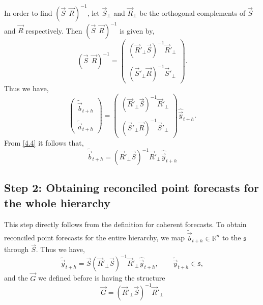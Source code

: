 \documentclass[graybox]{svmult}
\begin{document}
In order to find $(\vec{S} ~ ~ \vec{R})^{-1}$, let $\vec{S}_{\bot}$ and $\vec{R}_{\bot}$ be the orthogonal complements of $\vec{S}$ and $\vec{R}$
respectively. Then $(\vec{S} ~ ~ \vec{R})^{-1}$ is given by,
\begin{equation}\label{eq:16}
(\vec{S} ~ ~ \vec{R})^{-1} = \begin{pmatrix}
(\vec{R}'_\bot \vec{S})^{-1}\vec{R}'_\bot \\ \\ (\vec{S}'_\bot \vec{R})^{-1}\vec{S}'_\bot
\end{pmatrix}.
\end{equation}
Thus we have,
\begin{equation} \label{eq:17}
\begin{pmatrix}
\tilde{\vec{b}}_{t+h} \\ \\ \tilde{\vec{a}}_{t+h}
\end{pmatrix} = \begin{pmatrix}
(\vec{R}'_\bot \vec{S})^{-1}\vec{R}'_\bot \\ \\ (\vec{S}'_\bot \vec{R})^{-1}\vec{S}'_\bot
\end{pmatrix}\hat{\vec{y}}_{t+h}.
\end{equation}
From \eqref{4.4} it follows that,
\begin{equation}
\tilde{\vec{b}}_{t+h}=(\vec{R}'_\bot \vec{S})^{-1}\vec{R}'_\bot \hat{\vec{y}}_{t+h}
\end{equation}

\subsection*{Step 2: Obtaining reconciled point forecasts for the whole hierarchy}

This step directly follows from the definition for coherent forecasts. To obtain reconciled point forecasts for the entire hierarchy, we map $\tilde{\vec{b}}_{t+h} \in \mathbb{R}^n$ to the $\mathfrak{s}$ through $\vec{S}$. Thus we have, 
\begin{equation} \label{eq:18}
\tilde{\vec{y}}_{t+h}=\vec{S}(\vec{R}'_\bot \vec{S})^{-1}\vec{R}'_\bot \hat{\vec{y}}_{t+h}, \qquad \tilde{\vec{y}}_{t+h} \in \mathfrak{s},
\end{equation}
and the $\vec{G}$ we defined before is having the structure 
\begin{equation} \label{eq:19}
\vec{G}=(\vec{R}'_\bot \vec{S})^{-1}\vec{R}'_\bot
\end{equation}
\end{document}
